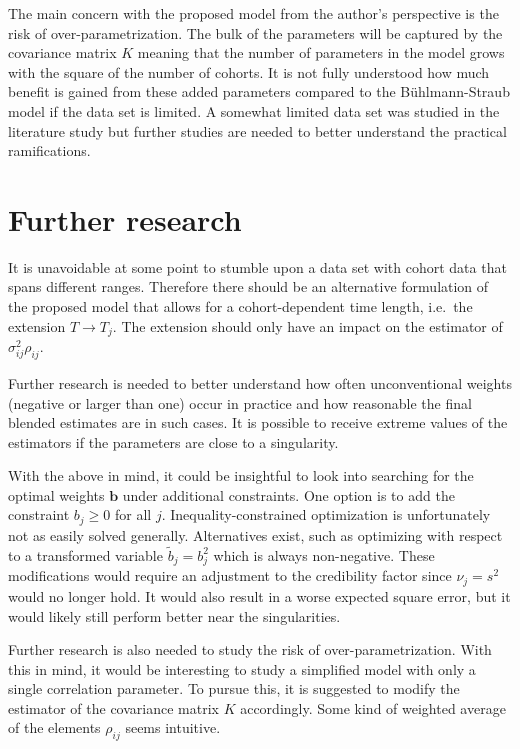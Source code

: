 \documentclass[11pt]{article}
\theoremstyle{definition}
\begin{document}
The main concern with the proposed model from the author's perspective is the risk of over-parametrization. The bulk of the parameters will be captured by the covariance matrix $ K$ meaning that the number of parameters in the model grows with the square of the number of cohorts. It is not fully understood how much benefit is gained from these added parameters compared to the Bühlmann-Straub model if the data set is limited. A somewhat limited data set was studied in the literature study but further studies are needed to better understand the practical ramifications.

\newpage
\section{Further research}
It is unavoidable at some point to stumble upon a data set with cohort data that spans different ranges. Therefore there should be an alternative formulation of the proposed model that allows for a cohort-dependent time length, i.e.\ the extension $T\rightarrow T_j$. The extension should only have an impact on the estimator of $\sigma_{ij}^2\rho_{ij}$.

Further research is needed to better understand how often unconventional weights (negative or larger than one) occur in practice and how reasonable the final blended estimates are in such cases. It is possible to receive extreme values of the estimators if the parameters are close to a singularity. 

With the above in mind, it could be insightful to look into searching for the optimal weights $\bm b$ under additional constraints. One option is to add the constraint $b_j\geq 0$ for all $j$. Inequality-constrained optimization is unfortunately not as easily solved generally. Alternatives exist, such as optimizing with respect to a transformed variable $\tilde b_j = b_j^2$ which is always non-negative. These modifications would require an adjustment to the credibility factor since $\nu_j=s^2$ would no longer hold. It would also result in a worse expected square error, but it would likely still perform better near the singularities.

Further research is also needed to study the risk of over-parametrization. With this in mind, it would be interesting to study a simplified model with only a single correlation parameter. To pursue this, it is suggested to modify the estimator of the covariance matrix $ K$ accordingly. Some kind of weighted average of the elements $\rho_{ij}$ seems intuitive.
\end{document}
